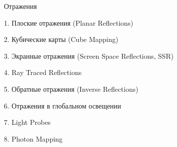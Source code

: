 \documentclass{beamer}
\begin{document}
	\begin{frame}{Отражения}

		1. Плоские отражения (Planar Reflections)

		2. Кубические карты (Cube Mapping)

		3. Экранные отражения (Screen Space Reflections, SSR)

		4. Ray Traced Reflections

		5. Обратные отражения (Inverse Reflections)

		6. Отражения в глобальном освещении

		7. Light Probes%

		8. Photon Mapping%

	\end{frame}

	\fi
\end{document}
